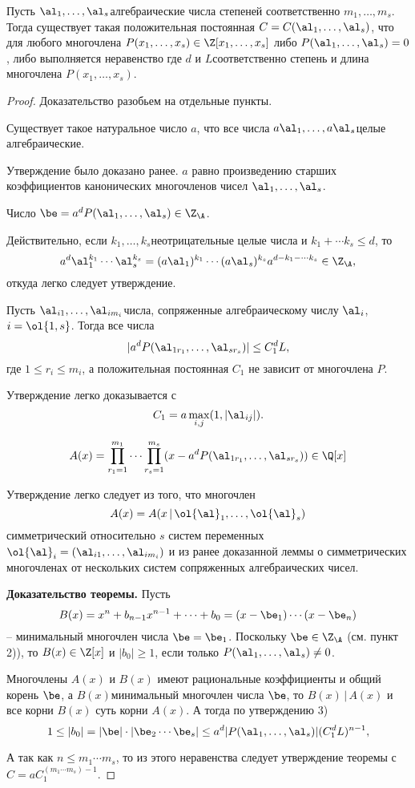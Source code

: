 \documentclass{article}
\begin{document}
\begin{theorem}
Пусть $\al_1, \dots, \al_s$\т алгебраические числа степеней соответственно $m_1, \dots, m_s$.
Тогда существует такая положительная постоянная $C=C(\al_1, \dots, \al_s)$, что для любого многочлена
$P(x_1, \dots, x_s) \in \Z[x_1, \dots, x_s]$ либо
$P(\al_1, \dots, \al_s)=0$, либо выполняется неравенство
где $d$ и $L$\т соответственно степень и длина многочлена $P(x_1, \dots, x_s)$.
\end{theorem}
\begin{proof}
Доказательство разобьем на отдельные пункты.

 Существует такое натуральное число $a$, что все числа $a \al_1, \dots, a \al_s$\т целые алгебраические.

Утверждение было доказано ранее. $a$ равно произведению старших коэффициентов
канонических многочленов чисел $\al_1, \dots, \al_s$.

 Число $\be = a^d P(\al_1, \dots, \al_s) \in \Z_{\A}$.

Действительно, если $k_1, \dots, k_s$\т неотрицательные целые числа и
$k_1+ \cdots k_s \le d$, то
$$
a^d \al_1^{k_1} \cdots \al_s^{k_s} = (a \al_1)^{k_1} \cdots
(a \al_s)^{k_s}a^{d-k_1- \cdots k_s} \in \Z_{\A},
$$
откуда легко следует утверждение.
\vskip 5mm

 Пусть $\al_{i1}, \dots, \al_{im_i}$\т числа, сопряженные алгебраическому числу  $\al_i$, $i= \ol{1,s}$.
Тогда все числа
$$|a^dP(\al_{1r_1}, \dots, \al_{sr_s})| \le C_1^d L,$$
где $1 \le r_i \le m_i$, а положительная постоянная  $C_1$ не зависит от многочлена $P$.

Утверждение легко доказывается с
$$C_1= a \max_{i,j} (1, |\al_{ij}|).$$

$$
A(x)= \prod_{r_1=1}^{m_1} \cdots \prod_{r_s=1}^{m_s} (x-a^dP(\al_{1r_1}, \dots, \al_{sr_s})) \in \Q[x]
$$

Утверждение легко следует из того, что многочлен
$$A(x) = A(x \,| \, \ol {\al}_1, \dots, \ol {\al}_s)$$
симметрический относительно $s$  систем переменных
$\ol{\al}_i= (\al_{i1}, \dots, \al_{im_i})$ и из ранее доказанной
леммы о симметрических многочленах от нескольких систем сопряженных
алгебраических чисел.

\textbf{Доказательство теоремы.} Пусть
$$
B(x)= x^n+b_{n-1}x^{n-1}+ \cdots +b_0 = (x- \be_1) \cdots (x- \be_n)
$$
-- минимальный многочлен числа $\be = \be_1$. Поскольку
$\be \in \Z_{\A}$ (см. пункт 2)), то $B(x) \in \Z [x]$ и
$|b_0| \ge 1$, если только $P(\al_1, \dots, \al_s) \ne 0$.

Многочлены $A(x)$  и $B(x)$  имеют рациональные коэффициенты и
общий корень $\be$,  а  $B(x)$\т минимальный многочлен числа
$\be$,    то $B(x) \,| \, A(x)$  и все корни $B(x)$  суть корни $A(x)$.
А тогда по утверждению 3)
$$
1 \le |b_0| = |\be| \cdot |\be_2 \cdots \be_s| \le
a^d|P(\al_1, \dots, \al_s)| ( C_1^d L)^{n-1},
$$

А так как $n \le m_1 \cdots m_s$, то из этого неравенства следует утверждение
теоремы с $C=a C_1^{(m_1 \cdots m_s)-1}$.
\end{proof}
\end{document}
